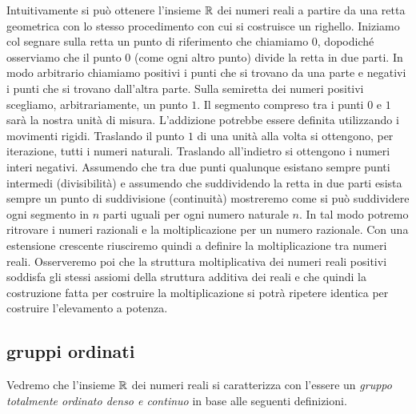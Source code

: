 Intuitivamente si può ottenere l'insieme ${\mathbb R}$ dei numeri reali
a partire da una retta geometrica 
con lo stesso procedimento con cui si costruisce un righello.
Iniziamo col segnare
sulla retta un punto di riferimento che chiamiamo $0$, 
dopodiché osserviamo che
il punto $0$ (come ogni altro punto) divide la retta in due parti. In modo arbitrario
chiamiamo positivi i punti che si trovano da una parte e negativi i punti che
si trovano dall'altra parte. Sulla semiretta dei numeri positivi scegliamo, arbitrariamente,
un punto $1$. Il segmento compreso tra i punti $0$ e $1$ sarà la nostra unità di
misura.
L'addizione potrebbe essere definita utilizzando i movimenti rigidi.
Traslando il punto $1$ di una unità alla volta si ottengono, per iterazione, tutti i numeri naturali.
Traslando all'indietro si ottengono i numeri interi negativi. 
Assumendo che tra due punti qualunque esistano sempre punti intermedi (divisibilità) e
assumendo che suddividendo la retta in due parti esista sempre un punto di 
suddivisione (continuità) mostreremo come si può suddividere 
ogni segmento in $n$ parti uguali per ogni numero naturale $n$. 
In tal modo potremo ritrovare i numeri razionali e la moltiplicazione per un numero razionale.
Con una estensione crescente riusciremo quindi a definire la moltiplicazione 
tra numeri reali. 
Osserveremo poi che la struttura moltiplicativa dei numeri reali positivi soddisfa 
gli stessi assiomi della struttura additiva dei reali e che quindi la costruzione fatta 
per costruire la moltiplicazione si potrà ripetere identica per costruire l'elevamento a potenza.

\subsection{gruppi ordinati}

Vedremo che l'insieme ${\mathbb R}$ dei numeri reali si caratterizza 
con l'essere un \emph{gruppo totalmente ordinato denso e continuo}
in base alle seguenti definizioni.

